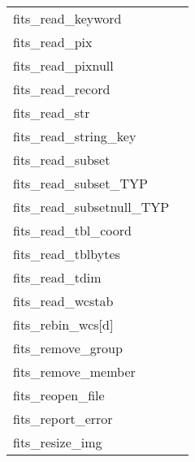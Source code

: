 \documentclass[11pt]{book}
\begin{document}
\begin{tabular}{lr}
fits\_read\_keyword      & \pageref{ffgkey} \\
fits\_read\_pix  & \pageref{ffgpxv} \\
fits\_read\_pixnull & \pageref{ffgpxf} \\
fits\_read\_record       & \pageref{ffgrec} \\
fits\_read\_str         & \pageref{ffgcrd} \\
fits\_read\_string\_key & \pageref{ffgsky} \\
fits\_read\_subset  & \pageref{ffgsv} \\
fits\_read\_subset\_TYP  & \pageref{ffgsvx} \pageref{ffgsvx2}\\
fits\_read\_subsetnull\_TYP & \pageref{ffgsfx} \pageref{ffgsfx2} \\
fits\_read\_tbl\_coord & \pageref{ffgtcs} \\
fits\_read\_tblbytes    & \pageref{ffgtbb} \\
fits\_read\_tdim         & \pageref{ffgtdm} \\
fits\_read\_wcstab       & \pageref{wcstab} \\
fits\_rebin\_wcs[d]  &  \pageref{rebinwcs} \\
fits\_remove\_group  & \pageref{ffgtrm} \\
fits\_remove\_member   & \pageref{ffgmrm} \\
fits\_reopen\_file      & \pageref{ffreopen} \\
fits\_report\_error   & \pageref{ffrprt} \\
fits\_resize\_img     & \pageref{ffrsim} \\
\end{tabular}
\end{document}
